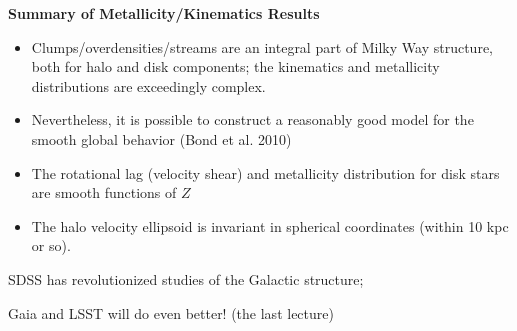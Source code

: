 \documentclass[letterpaper,landscape]{slides}
\begin{document}







\begin{slide}

\begin{center}
\bfseries
\large {} Summary of Metallicity/Kinematics Results
\end{center}
\vskip 0.2in
\begin{itemize}
   \item {\color{blue} Clumps/overdensities/streams are an integral part of
       Milky Way structure,} both for halo and disk components;  
       the kinematics and metallicity distributions are exceedingly complex.
  \item 
    {\color{blue} Nevertheless, it is possible to construct a reasonably good
   model for the smooth global behavior (Bond et al. 2010)}
   \item The rotational lag (velocity shear) and metallicity distribution
     for disk stars are {\color{blue} smooth} functions of $Z$
   \item The halo velocity ellipsoid is invariant in spherical coordinates (within 10 kpc or so). 
\end{itemize}    

{ SDSS has revolutionized studies of the Galactic structure;}

{ Gaia and LSST will do even better!} (the last lecture)

\end{slide}



\end{document}
